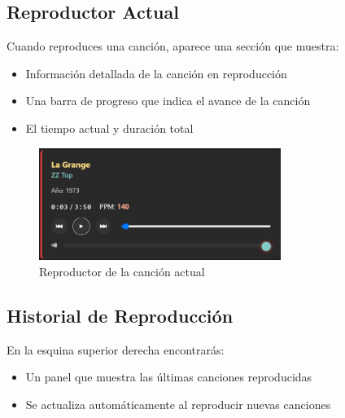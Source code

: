 \documentclass[a4paper,12pt]{article}
\begin{document}


\subsection{Reproductor Actual}
Cuando reproduces una canción, aparece una sección que muestra:
\begin{itemize}
    \item Información detallada de la canción en reproducción
    \item Una barra de progreso que indica el avance de la canción
    \item El tiempo actual y duración total
\end{itemize}

 \begin{figure}[h]
     \centering
     \includegraphics[width=0.7\textwidth]{imagenes/reproductor.png}
     \caption{Reproductor de la canción actual}
 \end{figure}

\subsection{Historial de Reproducción}
En la esquina superior derecha encontrarás:
\begin{itemize}
    \item Un panel que muestra las últimas canciones reproducidas
    \item Se actualiza automáticamente al reproducir nuevas canciones
\end{itemize}
\end{document}
